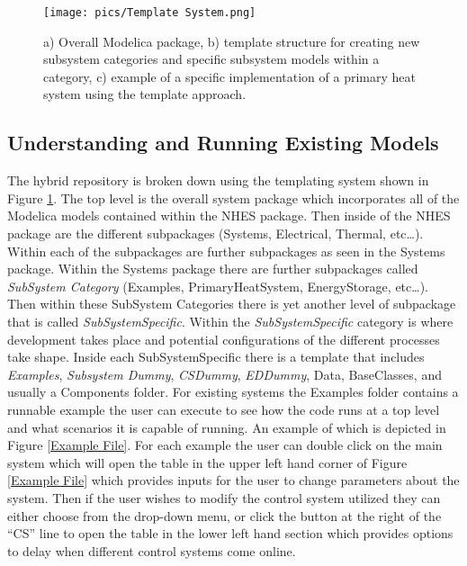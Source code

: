\begin{figure}[hbtp]
\centering
\texttt{[image: pics/Template System.png]}
\caption{a) Overall Modelica package, b) template structure for creating new subsystem categories and specific subsystem models within a category,  c) example of a specific implementation of a primary heat system using the template approach. }
\label{fig:Template}
\end{figure}



\subsection{Understanding and Running Existing Models}

The hybrid repository is broken down using the templating system shown in Figure \ref{fig:Template}. 
The top level is the overall system package which incorporates all of the Modelica models contained within the NHES package. Then inside of the NHES package are the different subpackages (Systems, Electrical, Thermal, etc…). Within each of the subpackages are further subpackages as seen in the Systems package. Within the Systems package there are further subpackages called \textit{SubSystem Category} (Examples, PrimaryHeatSystem, EnergyStorage, etc…). Then within these SubSystem Categories there is yet another level of subpackage that is called \textit{SubSystem\textunderscore Specific}. Within the \textit{SubSystem\textunderscore Specific} category is where development takes place and potential configurations of the different processes take shape. Inside each SubSystem\textunderscore Specific there is a template that includes \textit{Examples}, \textit{Subsystem Dummy}, \textit{CS\textunderscore Dummy}, \textit{ED\textunderscore Dummy}, Data, BaseClasses, and usually a Components folder. For existing systems the Examples folder contains a runnable example the user can execute to see how the code runs at a top level and what scenarios it is capable of running. An example of which is depicted in Figure \ref{Example File}. For each example the user can double click on the main system which will open the table in the upper left hand corner of Figure \ref{Example File} which provides inputs for the user to change parameters about the system. Then if the user wishes to modify the control system utilized they can either choose from the drop-down menu, or click the button at the right of the “CS” line to open the table in the lower left hand section which provides options to delay when different control systems come online.  

